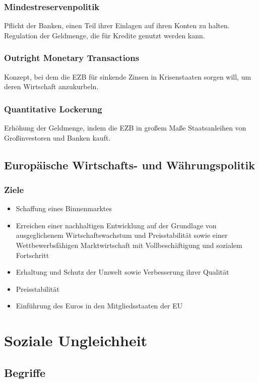 \documentclass{article}
\begin{document}
	\subsubsection{Mindestreservenpolitik}
	Pflicht der Banken, einen Teil ihrer Einlagen auf ihren Konten zu halten. Regulation der Geldmenge, die für Kredite genutzt werden kann.

	\subsubsection{Outright Monetary Transactions}
	Konzept, bei dem die EZB für sinkende Zinsen in Krisenstaaten sorgen will, um deren Wirtschaft anzukurbeln.

	\subsubsection{Quantitative Lockerung}
	Erhöhung der Geldmenge, indem die EZB in großem Maße Staatsanleihen von Großinvestoren und Banken kauft.

	\subsection{Europäische Wirtschafts- und Währungspolitik}
	\subsubsection{Ziele}

	\begin{itemize}
		\item Schaffung eines Binnenmarktes
		\item Erreichen einer nachhaltigen Entwicklung auf der Grundlage von ausgeglichenem Wirtschaftswachstum und Preisstabilität sowie einer Wettbewerbsfähigen Marktwirtschaft mit Vollbeschäftigung und sozialem Fortschritt
		\item Erhaltung und Schutz der Umwelt sowie Verbesserung ihrer Qualität
		\item Preisstabilität
		\item Einführung des Euros in den Mitgliedsstaaten der EU
	\end{itemize}
	
	\section{Soziale Ungleichheit}
	\subsection{Begriffe}
\end{document}
